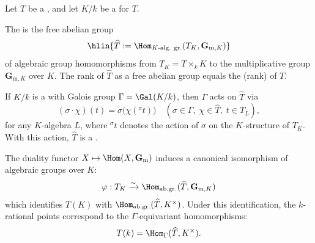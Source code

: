 \begin{definition} \label{definition:character_module_of_a_torus_over_a_field}
    Let $T$ be a , and let $K/k$ be a  for $T$.

    The  is the free abelian group
    $$\hlin{\widehat{T} := \Hom_{K\text{-alg. gr.}}(T_K, \mathbf{G}_{\mathrm{m},K})}$$
    of algebraic group homomorphisms from $T_K = T \times_k K$ to the multiplicative group $\mathbf{G}_{\mathrm{m},K}$ over $K$. The rank of $\widehat{T}$ as a free abelian group equals the  (rank) of $T$.

    If $K/k$ is a  with Galois group $\Gamma = \Gal(K/k)$, then $\Gamma$ acts on $\widehat{T}$ via
    $$(\sigma \cdot \chi)(t) = \sigma\bigl(\chi({}^\sigma t)\bigr) \quad (\sigma \in \Gamma,\; \chi \in \widehat{T},\; t \in T_L),$$
    for any $K$-algebra $L$, where ${}^\sigma t$ denotes the action of $\sigma$ on the $K$-structure of $T_K$. With this action, $\widehat{T}$ is a .

    The duality functor $X \mapsto \Hom(X, \mathbf{G}_\mathrm{m})$ induces a canonical isomorphism of algebraic groups over $K$:
    $$\varphi: T_K \xrightarrow{\sim} \Hom_{\mathrm{ab. gr.}}(\widehat{T}, \mathbf{G}_{\mathrm{m},K})$$
    which identifies $T(K)$ with $\Hom_{\mathrm{ab. gr.}}(\widehat{T}, K^\times)$. Under this identification, the $k$-rational points correspond to the $\Gamma$-equivariant homomorphisms:
    $$T(k) = \Hom_\Gamma(\widehat{T}, K^\times).$$
\end{definition}
